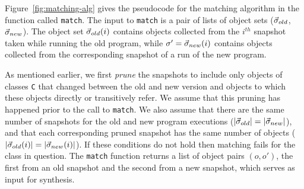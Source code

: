 \documentclass[natbib,10pt]{sigplanconf}
\newcommand{\code}[1]{\lstinline|#1|\xspace}
\begin{document}
Figure~\ref{fig:matching-alg} gives the pseudocode for the matching
algorithm in the function called \code{match}.  
The input to \code{match} is a pair of lists of object sets
($\vec{\sigma}_{old}$, $\vec{\sigma}_{new}$).  The object set
$\vec{\sigma}_{old}(i)$ contains objects collected from the $i^{th}$
snapshot taken while running the old program, while $\sigma' =
\vec{\sigma}_{new}(i)$ contains objects collected from the corresponding
snapshot of a run of the new program.  

As mentioned earlier, we first \emph{prune}
the snapshots to include only objects of classes 
\code{C} that changed between the old and new version and
objects to which these objects directly or transitively refer.
We assume that this pruning has happened prior to the call to \code{match}.
We also assume that there are the same number of snapshots for the old and
new program executions ($\lvert \vec{\sigma}_{old} \rvert =
\lvert \vec{\sigma}_{new} \rvert$), and that each corresponding pruned snapshot has
the same number of objects ($\lvert \vec{\sigma}_{old}(i) \rvert =
\lvert \vec{\sigma}_{new}(i) \rvert$). 
If these conditions do not hold then matching fails for the class in question.
The \code{match} function returns a list of object pairs $(o,o')$, the
first from an old snapshot and the second from a new snapshot, which
serves as input for synthesis.
\end{document}
